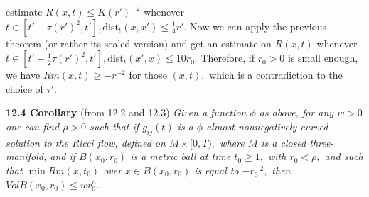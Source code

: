 \documentclass[12pt]{article}
\theoremstyle{plain}
{\swapnumbers
\newtheorem{thm}{Theorem}[section]
\newtheorem{cor}[thm]{Corollary}
\newtheorem{lem}[thm]{Lemma}
\newtheorem{prop}[thm]{Proposition}
}
\theoremstyle{definition}
{\swapnumbers
\newtheorem{defn}[thm]{Definition}
\newtheorem{nota}[thm]{Notation}
\newtheorem{parag}[thm]{}
\newtheorem*{parstr}{\addtocounter{thm}{1}\thesection.\arabic{thm}*}
\newtheorem*{intropar}{\addtocounter{thm}{1}\arabic{thm}}
}
\theoremstyle{remark} {\swapnumbers
\newtheorem{rem}[thm]{Remark}
\newtheorem{exam}[thm]{Example}
\newtheorem{lemma}[thm]{Lemma}
\newtheorem{claim}[thm]{Claim}
}
\numberwithin{equation}{section}
\begin{document}
            estimate $R(x,t)\le K(r')^{-2}$ whenever $t\in
            [t'-\tau (r')^2,t'], \mbox{dist}_t(x,x')\le
            \frac{1}{4}r'.$ Now we can apply the previous theorem
            (or rather its scaled version) and get an estimate on
            $R(x,t)$ whenever $t\in [t'-\frac{1}{2}\tau
            (r')^2,t'], \mbox{dist}_t(x',x)\le 10r_0.$ Therefore,
            if $r_0>0$ is small enough, we  have $Rm(x,t)\ge
            -r_0^{-2}$ for those $(x,t),$ which is a contradiction
            to the choice of $\tau '.$
            \par {\bf 12.4 Corollary} (from 12.2 and 12.3) {\it Given a
            function $\phi$ as above, for any $w>0$ one can find
            $\rho>0$ such that if $g_{ij}(t)$ is a $\phi$-almost
            nonnegatively curved solution to the Ricci flow,
            defined on $M\times [0,T),$ where $M$ is a closed three-manifold, and
            if $B(x_0,r_0)$ is a metric ball at time $t_0\ge 1,$
            with $r_0<\rho,$ and such that $\min Rm(x,t_0)$
            over $x\in B(x_0,r_0)$ is equal to $-r_0^{-2},$ then
            $VolB(x_0,r_0)\le wr_0^n.$}
\end{document}
